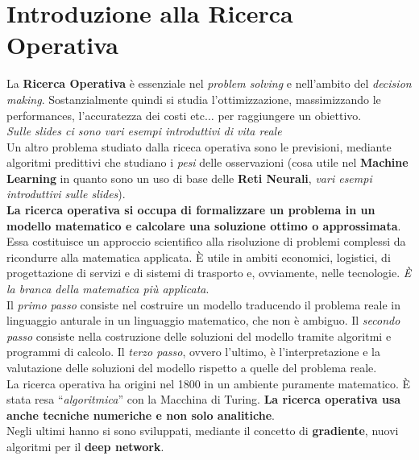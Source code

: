 \documentclass[a4paper,12pt, oneside]{book}
\begin{document}
\chapter{Introduzione alla Ricerca Operativa}
La\textbf{ Ricerca Operativa} è essenziale nel \textit{problem
  solving} e nell'ambito del \textit{decision making}.
Sostanzialmente quindi si studia l'ottimizzazione, massimizzando le
performances, l'accuratezza dei costi etc$\ldots$ per raggiungere un
obiettivo. \\ \textit{Sulle slides ci sono vari esempi introduttivi di
  vita reale}\\
Un altro problema studiato dalla riceca operativa sono le previsioni,
mediante algoritmi predittivi che studiano i \textit{pesi} delle
osservazioni (cosa utile nel \textbf{Machine Learning} in quanto sono
un uso di base delle \textbf{Reti Neurali}, \textit{vari esempi
  introduttivi sulle slides}).\\
\textbf{La ricerca operativa si occupa di formalizzare un problema in
  un modello matematico e calcolare una soluzione ottimo o
  approssimata}. Essa costituisce un approccio scientifico alla
risoluzione di problemi complessi da ricondurre alla matematica
applicata. È utile in ambiti economici, logistici, di progettazione di
servizi e di sistemi di trasporto e, ovviamente, nelle tecnologie.
\textit{È la branca della matematica più applicata}.\\
Il \textit{primo passo} consiste nel costruire un modello traducendo il
problema reale in linguaggio anturale in un linguaggio matematico, che
non è ambiguo. Il \textit{secondo passo} consiste nella costruzione delle
soluzioni del modello tramite algoritmi e programmi di calcolo. Il
\textit{terzo passo}, ovvero l'ultimo, è l'interpretazione e la
valutazione delle soluzioni del modello rispetto a quelle del problema
reale.\\
La ricerca operativa ha origini nel 1800 in un ambiente puramente
matematico. È stata resa ``\textit{algoritmica}'' con la Macchina di
Turing. \textbf{La ricerca operativa usa anche tecniche numeriche e
  non solo analitiche}.\\
Negli ultimi hanno si sono sviluppati, mediante il concetto di
\textbf{gradiente}, nuovi algoritmi per il \textbf{deep network}.\\
\end{document}
